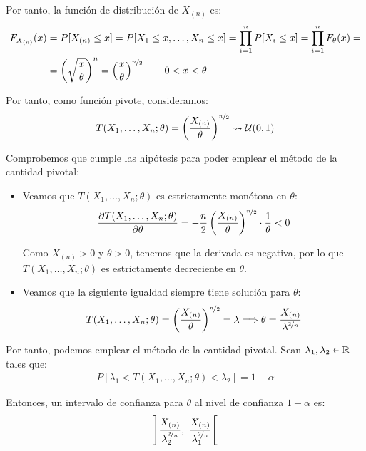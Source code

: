 \begin{ejercicio}[de Examen]
\begin{enumerate}
        Por tanto, la función de distribución de $X_{(n)}$ es:
        \begin{align*}
            F_{X_{(n)}}(x) &= P[X_{(n)} \leq x] = P[X_1 \leq x, \ldots, X_n \leq x] = \prod_{i=1}^{n} P[X_i \le x] = \prod_{i=1}^{n} F_\theta(x) =\\&= \left(\sqrt{\dfrac{x}{\theta}}\right)^n = \left(\dfrac{x}{\theta}\right)^{\nicefrac{n}{2}}\qquad 0 < x < \theta
        \end{align*}

        Por tanto, como función pivote, consideramos:
        \begin{align*}
            T(X_1, \ldots, X_n; \theta) = \left(\dfrac{X_{(n)}}{\theta}\right)^{\nicefrac{n}{2}} \rightsquigarrow \mathcal{U}(0, 1)
        \end{align*}

        Comprobemos que cumple las hipótesis para poder emplear el método de la cantidad pivotal:
        \begin{itemize}
            \item Veamos que $T(X_1, \ldots, X_n; \theta)$ es estrictamente monótona en $\theta$:
            \begin{align*}
                \frac{\partial T(X_1, \ldots, X_n; \theta)}{\partial \theta} = -\frac{n}{2}\left(\dfrac{X_{(n)}}{\theta}\right)^{\nicefrac{n}{2}}\cdot \frac{1}{\theta} < 0
            \end{align*}

            Como $X_{(n)} > 0$ y $\theta > 0$, tenemos que la derivada es negativa, por lo que $T(X_1, \ldots, X_n; \theta)$ es estrictamente decreciente en $\theta$.
            \item Veamos que la siguiente igualdad siempre tiene solución para $\theta$:
            \begin{align*}
                T(X_1, \ldots, X_n; \theta) = \left(\dfrac{X_{(n)}}{\theta}\right)^{\nicefrac{n}{2}} = \lambda \Longrightarrow \theta = \dfrac{X_{(n)}}{\lambda^{\nicefrac{2}{n}}}
            \end{align*}
        \end{itemize}

        Por tanto, podemos emplear el método de la cantidad pivotal. Sean $\lambda_1,\lambda_2\in \mathbb{R}$ tales que:
        \begin{align*}
            P[\lambda_1 < T(X_1, \ldots, X_n; \theta) < \lambda_2] = 1 - \alpha
        \end{align*}

        Entonces, un intervalo de confianza para $\theta$ al nivel de confianza $1 - \alpha$ es:
        \begin{align*}
            \left]\dfrac{X_{(n)}}{\lambda_2^{\nicefrac{2}{n}}},\  \dfrac{X_{(n)}}{\lambda_1^{\nicefrac{2}{n}}}\right[
        \end{align*}


\end{enumerate}
\end{ejercicio}

